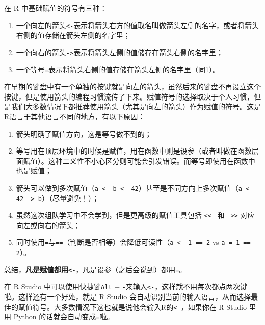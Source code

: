 \documentclass[]{ctexbook}
\providecommand{\tightlist}{%
  \setlength{\itemsep}{0pt}\setlength{\parskip}{0pt}}
\newcommand{\passthrough}[1]{#1}
\begin{document}
在 R 中基础赋值的符号有三种：

\begin{enumerate}
\def\labelenumi{\arabic{enumi}.}
\tightlist
\item
  一个向左的箭头\passthrough{\lstinline!<-!}表示将箭头右方的值取名叫做箭头左侧的名字，或者将箭头右侧的值存储在箭头左侧的名字里；
\item
  一个向右的箭头\passthrough{\lstinline!->!}表示将箭头左侧的值储存在箭头右侧的名字里；
\item
  一个等号\passthrough{\lstinline!=!}表示将箭头右侧的值存储在箭头左侧的名字里（同1）。
\end{enumerate}

在早期的键盘中有一个单独的按键就是向左的箭头，虽然后来的键盘不再设立这个按键，但是使用箭头的编程习惯流传了下来。赋值符号的选择取决于个人习惯，但是我们大多数情况下都推荐使用箭头（尤其是向左的箭头）作为赋值的符号。这是R语言于其他语言不同的地方，有以下原因：

\begin{enumerate}
\def\labelenumi{\arabic{enumi}.}
\tightlist
\item
  箭头明确了赋值方向，这是等号做不到的；
\item
  等号用在顶层环境中的时候是赋值，用在函数中则是设参（或者叫做在函数层面赋值）。这种二义性不小心区分则可能会引发错误。而等号即使用在函数中也是赋值；
\item
  箭头可以做到多次赋值（\passthrough{\lstinline!a <- b <- 42!}）甚至是不同方向上多次赋值（\passthrough{\lstinline!a <- 42 -> b!}）（尽量避免！）；
\item
  虽然这次组队学习中不会学到，但是更高级的赋值工具包括 \passthrough{\lstinline!<<-!} 和 \passthrough{\lstinline!->>!} 对应向左或向右的箭头；
\item
  同时使用\passthrough{\lstinline!=!}与\passthrough{\lstinline!==!}（判断是否相等）会降低可读性（\passthrough{\lstinline!a <- 1 == 2!} vs \passthrough{\lstinline!a = 1 == 2!}）。
\end{enumerate}

总结，\textbf{凡是赋值都用\passthrough{\lstinline!<-!}}，凡是设参（之后会说到）都用\passthrough{\lstinline!=!}。

在 R Studio 中可以使用快捷键\passthrough{\lstinline!Alt!} + \passthrough{\lstinline!-!}来输入\passthrough{\lstinline!<-!}，这样就不用每次都点两次键啦。这样还有一个好处，就是 R Studio 会自动识别当前的输入语言，从而选择最佳的赋值符号。大多数情况下这也就是说他会输入R的\passthrough{\lstinline!<-!}，如果你在 R Studio 里用 Python 的话就会自动变成\passthrough{\lstinline!=!}啦。
\end{document}
